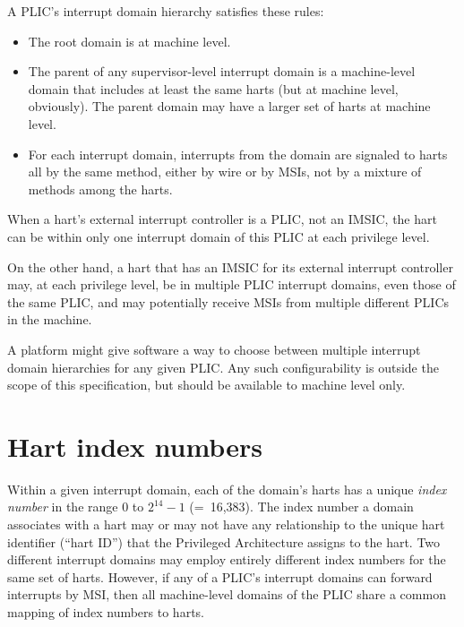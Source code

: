 A PLIC's interrupt domain hierarchy satisfies these rules:
\begin{itemize}

\item
The root domain is at machine level.

\item
The parent of any supervisor-level interrupt domain is a machine-level
domain that includes at least the same harts (but at machine level,
obviously).
The parent domain may have a larger set of harts at machine level.

\item
For each interrupt domain, interrupts from the domain are signaled
to harts all by the same method, either by wire or by MSIs, not by a
mixture of methods among the harts.

\end{itemize}

When a {\RISCV} hart's external interrupt controller is a PLIC, not an
IMSIC, the hart can be within only one interrupt domain of this PLIC at
each privilege level.

On the other hand, a hart that has an IMSIC for its external interrupt
controller may, at each privilege level, be in multiple PLIC interrupt
domains, even those of the same PLIC, and may potentially receive MSIs
from multiple different PLICs in the machine.

A platform might give software a way to choose between multiple
interrupt domain hierarchies for any given PLIC.
Any such configurability is outside the scope of this specification,
but should be available to machine level only.

\section{Hart index numbers}

Within a given interrupt domain, each of the domain's harts has a
unique \emph{index number} in the range 0 to ${\mbox{2}^{14}-\mbox{1}}$
(=~16,383).
The index number a domain associates with a hart may or may not have
any relationship to the unique hart identifier (``hart ID'') that the
{\RISCV} Privileged Architecture assigns to the hart.
Two different interrupt domains may employ entirely different index
numbers for the same set of harts.
However, if any of a PLIC's interrupt domains can forward interrupts by
MSI, then all machine-level domains of the PLIC share a common mapping
of index numbers to harts.

